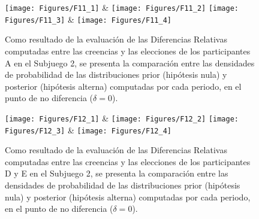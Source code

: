 \begin{figure}[h]
\centering
\texttt{[image: Figures/F11\_1]} & \texttt{[image: Figures/F11\_2]} 
\texttt{[image: Figures/F11\_3]} & \texttt{[image: Figures/F11\_4]} 
\decoRule
\caption[Evaluación de las Diferencias Relativas entre creencias y elecciones en los participantes A en el Subjuego 2 (Factor de Bayes)]{Como resultado de la evaluación de las Diferencias Relativas computadas entre las creencias y las elecciones de los participantes A en el Subjuego 2, se presenta la comparación entre las densidades de probabilidad de las distribuciones prior (hipótesis nula) y posterior (hipótesis alterna) computadas por cada periodo, en el punto de no diferencia ($\delta = 0$).}
\label{fig:DR_S2_A}
\end{figure}  


\begin{figure}[h]
\centering
\texttt{[image: Figures/F12\_1]} & \texttt{[image: Figures/F12\_2]} 
\texttt{[image: Figures/F12\_3]} & \texttt{[image: Figures/F12\_4]} 
\decoRule
\caption[Evaluación de las Diferencias Relativas entre creencias y elecciones en los participantes D y E en el Subjuego 2 (Factor de Bayes)]{Como resultado de la evaluación de las Diferencias Relativas computadas entre las creencias y las elecciones de los participantes D y E en el Subjuego 2, se presenta la comparación entre las densidades de probabilidad de las distribuciones prior (hipótesis nula) y posterior (hipótesis alterna) computadas por cada periodo, en el punto de no diferencia ($\delta = 0$).}
\label{fig:DR_S2_DyE}
\end{figure}  


